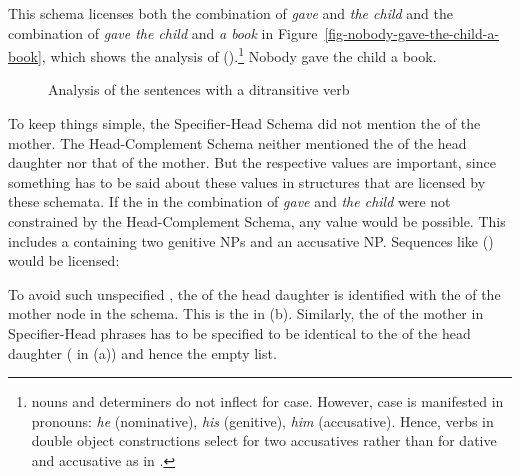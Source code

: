 This schema licenses both the combination of \emph{gave} and \emph{the child} and the combination of
\emph{gave the child} and \emph{a book} in Figure~\vref{fig-nobody-gave-the-child-a-book}, which shows the
analysis of ().\footnote{%
   nouns and determiners do not inflect for case. However, case is manifested in pronouns:
  \emph{he} (nominative), \emph{his} (genitive), \emph{him} (accusative). Hence, verbs in double object
  constructions select for two accusatives rather than for dative and accusative as in . 
}
\ea
\label{ex-nobody-gave-the-child-a-book}
Nobody gave the child a book.
\z
\begin{figure}
\caption{\label{fig-nobody-gave-the-child-a-book}Analysis of the sentences with a ditransitive verb}
\end{figure}

To keep things simple, the Specifier-Head Schema did not mention the \compsv of the mother. The
Head-Complement Schema neither mentioned the \sprv of the head daughter nor that of the mother. But the
respective values are important, since something has to be said about these values in structures
that are licensed by these schemata. If the \sprv in the combination of \emph{gave} and \emph{the
  child} were not constrained by the Head-Complement Schema, any value would be possible. This
includes a \sprl containing two genitive NPs and an accusative NP. Sequences like () would be
licensed:

\z
To avoid such unspecified \sprvs, the \sprv of the head daughter is identified with the \sprv of the
mother node in the schema. This is the  in (b). Similarly, the \compsv of the mother
in Specifier-Head phrases has to be specified to be identical to the \compsv of the head daughter
( in (a)) and hence the empty list.

